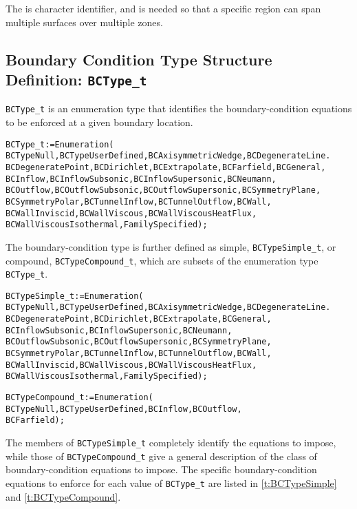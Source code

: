 The  is character identifier, and is needed so that a
specific region can span multiple surfaces over multiple zones.

\subsection{Boundary Condition Type Structure Definition: \texttt{BCType\_t}} 
\label{s:BCType}

\texttt{BCType\_t} is an enumeration type that identifies the boundary-condition
equations to be enforced at a given boundary location.
\begin{alltt}
  BCType\_t := Enumeration(
    BCTypeNull, BCTypeUserDefined, BCAxisymmetricWedge, BCDegenerateLine.
    BCDegeneratePoint, BCDirichlet, BCExtrapolate, BCFarfield, BCGeneral,
    BCInflow, BCInflowSubsonic, BCInflowSupersonic, BCNeumann,
    BCOutflow, BCOutflowSubsonic, BCOutflowSupersonic, BCSymmetryPlane,
    BCSymmetryPolar, BCTunnelInflow, BCTunnelOutflow, BCWall,
    BCWallInviscid, BCWallViscous, BCWallViscousHeatFlux,
    BCWallViscousIsothermal, FamilySpecified ) ;
\end{alltt}
The boundary-condition type is further defined as simple,
\texttt{BCTypeSimple\_t}, or compound, \texttt{BCTypeCompound\_t},
which are subsets of the enumeration type \texttt{BCType\_t}.
\begin{alltt}
  BCTypeSimple\_t := Enumeration(
    BCTypeNull, BCTypeUserDefined, BCAxisymmetricWedge, BCDegenerateLine.
    BCDegeneratePoint, BCDirichlet, BCExtrapolate, BCGeneral,
    BCInflowSubsonic, BCInflowSupersonic, BCNeumann,
    BCOutflowSubsonic, BCOutflowSupersonic, BCSymmetryPlane,
    BCSymmetryPolar, BCTunnelInflow, BCTunnelOutflow, BCWall,
    BCWallInviscid, BCWallViscous, BCWallViscousHeatFlux,
    BCWallViscousIsothermal, FamilySpecified ) ;
\end{alltt}

\begin{alltt}
  BCTypeCompound\_t := Enumeration(
    BCTypeNull, BCTypeUserDefined, BCInflow, BCOutflow,
    BCFarfield ) ;
\end{alltt}

The members of \texttt{BCTypeSimple\_t} completely identify the equations to
impose, while those of \texttt{BCTypeCompound\_t} give a general description of the class of
boundary-condition equations to impose.
The specific boundary-condition equations to enforce for each value
of \texttt{BCType\_t} are listed in \autoref{t:BCTypeSimple} and
\autoref{t:BCTypeCompound}.


